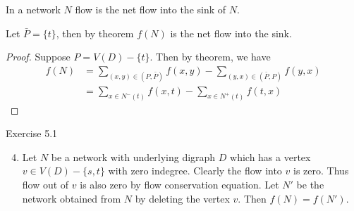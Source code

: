 \begin{corollary}
	In a network $N$ flow is the net flow into the sink of $N$.
\end{corollary}
\begin{synopsis}
	Let $\bar{P} = \{ t \}$, then by theorem $f(N)$ is the net flow into the sink.
\end{synopsis}
\begin{proof}
	Suppose $P = V(D)-\{t\}$. Then by theorem, we have
	\begin{align*}
		f(N) 	& = \sum_{(x,y) \in (P,\bar{P})} f(x,y) - \sum_{(y,x) \in (\bar{P},P)} f(y,x) \\
			& = \sum_{x \in N^-(t)} f(x,t) - \sum_{x \in N^+(t)} f(t,x)
	\end{align*}
\end{proof}
\begin{remark}Exercise 5.1
	\begin{enumerate}
		\setcounter{enumi}{3}
		\item Let $N$ be a network with underlying digraph $D$ which has a vertex $v \in V(D) - \{ s,t \}$ with zero indegree. Clearly the flow into $v$ is zero. Thus flow out of $v$ is also zero by flow conservation equation. Let $N'$ be the network obtained from $N$ by deleting the vertex $v$. Then $f(N) = f(N')$.
	\end{enumerate}
\end{remark}
